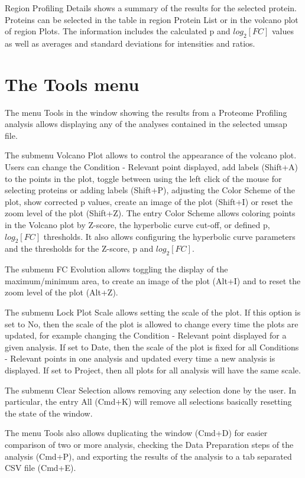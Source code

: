 Region Profiling Details shows a summary of the results for the selected protein.
Proteins can be selected in the table in region Protein List or in the volcano plot
of region Plots. The information includes the calculated p and $log_2[FC]$ values
as well as averages and standard deviations for intensities and ratios.

\section{The Tools menu}
\label{sec:protprofTools}

The menu Tools in the window showing the results from a Proteome Profiling analysis
allows displaying any of the analyses contained in the selected umsap file.

The submenu Volcano Plot allows to control the appearance of the volcano plot. Users
can change the Condition - Relevant point displayed, add labels (Shift+A) to
the points in the plot, toggle between using the left click of the mouse for selecting
proteins or adding labels (Shift+P), adjusting the Color Scheme of the plot, show
corrected p values, create an image of the plot (Shift+I) or reset the zoom level of
the plot (Shift+Z). The entry Color Scheme allows coloring points in the Volcano plot
by Z-score, the hyperbolic curve cut-off, or defined p, $log_2[FC]$ thresholds. It 
also allows configuring the hyperbolic curve parameters and the thresholds for the
Z-score, p and $log_2[FC]$.

The submenu FC Evolution allows toggling the display of the maximum/minimum area,
to create an image of the plot (Alt+I) and to reset the zoom level of the plot (Alt+Z).

The submenu Lock Plot Scale allows setting the scale of the plot. If this option
is set to No, then the scale of the plot is allowed to change every time the plots
are updated, for example changing the Condition - Relevant point displayed for a
given analysis. If set to Date, then the scale of the plot is fixed for all Conditions
- Relevant points in one analysis and updated every time a new analysis is displayed.
If set to Project, then all plots for all analysis will have the same scale.

The submenu Clear Selection allows removing any selection done by the user. In
particular, the entry All (Cmd+K) will remove all selections basically resetting
the state of the window.

The menu Tools also allows duplicating the window (Cmd+D) for easier comparison of
two or more analysis, checking the Data Preparation steps of the analysis (Cmd+P),
and exporting the results of the analysis to a tab separated CSV file (Cmd+E).

